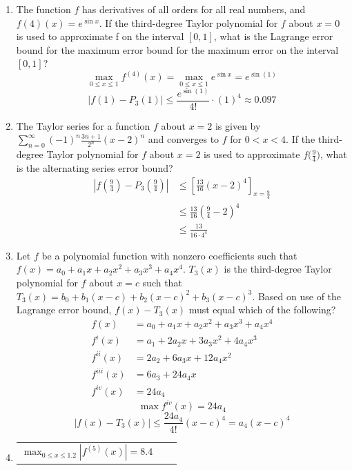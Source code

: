 \documentclass[12pt]{article}
\begin{document}
\begin{enumerate}
	\item The function $f$ has derivatives of all orders for all real numbers, and $f(4) (x)=e^{\sin x}$. If the third-degree Taylor polynomial for $f$ about $x=0$ is used to approximate f on the interval $[0,1]$, what is the Lagrange error bound for the maximum error bound for the maximum error on the interval $[0,1]$?
	$$\max_{0\leq x \leq 1} f^{(4)}(x) =\max_{0\leq x \leq 1} e^{\sin x} = e^{\sin (1)} $$
	$$|f(1)-P_{3}(1)| \leq \frac{e^{\sin (1)}}{4!}\cdot (1)^4 \approx \boxed{0.097}$$
	\item The Taylor series for a function $f$ about $x=2$ is given by $\sum_{n=0}^{\infty} (-1)^n \frac{3n+1}{2^n} (x-2)^n$ and converges to $f$ for $0<x<4$. If the third-degree Taylor polynomial for $f$ about $x=2$ is used to approximate $f\big(\frac{9}{4}\big)$, what is the alternating series error bound?
		\begin{align*}
			\left|f\left(\frac{9}{4}\right) - P_{3}\left(\frac{9}{4}\right)\right| &\leq \left[\frac{13}{16}(x-2)^4 \right]_{x=\frac{9}{4}} \\
			&\leq \frac{13}{16}\left(\frac{9}{4}-2\right)^4 \\ 
			&\leq \boxed{\frac{13}{16 \cdot 4^4}}
		\end{align*}
	\item Let $f$ be a polynomial function with nonzero coefficients such that $f(x)=a_0+a_1x+a_2x^2+a_3x^3+a_4x^4$. $T_3(x)$ is the third-degree Taylor polynomial for $f$ about $x=c$ such that $T_3(x)=b_0+b_1(x-c)+b_2(x-c)^2+b_3(x-c)^3$. Based on use of the Lagrange error bound, $f(x)-T_3(x)$ must equal which of the following?
	\begin{align*}
		f(x) 		&= a_0 + a_{1}x + a_{2}x^{2} + a_{3}x^{3} + a_{4}x^{4}\\
		f^{i}(x) 	&= a_1 + 2a_{2}x + 3a_{3}x^{2} + 4a_{4}x^{3}\\
		f^{ii}(x) 	&= 2a_{2} + 6a_{3}x + 12a_{4}x^{2}\\
		f^{iii}(x)	&= 6a_{3} + 24 a_{4}x\\
		f^{iv}(x) 	&= 24a_{4}
	\end{align*}
	$$\max f^{iv}(x) = 24a_{4}$$
	$$\left|f(x)-T_{3}(x)\right| \leq \frac{24a_{4}}{4!} (x-c)^4 = \boxed{a_{4}(x-c)^4}$$
	\item 
	      \begin{table}[h]
	      	\centering
			\def\arraystretch{2}
	      		\begin{tabular}{|l|l|l|}
					\hline
					$\displaystyle\max_{0 \leq x \leq 1.2} |f^{(5)}(x)| = 8.4$  &   

\end{tabular}
\end{table}
\end{enumerate}
\end{document}
